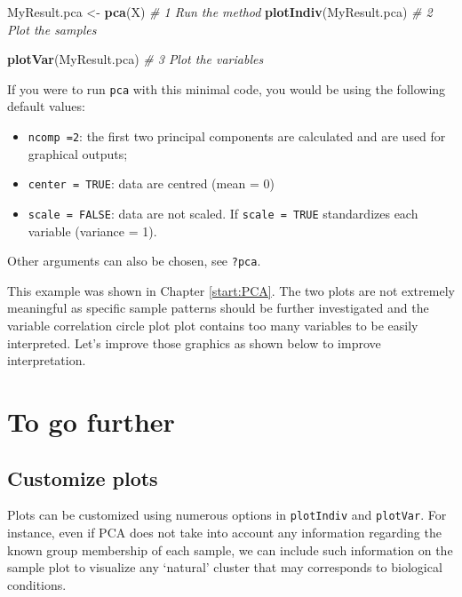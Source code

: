 \documentclass[]{book}
\newenvironment{Shaded}{\begin{snugshade}}{\end{snugshade}}
\newcommand{\KeywordTok}[1]{\textcolor[rgb]{0.13,0.29,0.53}{\textbf{#1}}}
\newcommand{\StringTok}[1]{\textcolor[rgb]{0.31,0.60,0.02}{#1}}
\newcommand{\CommentTok}[1]{\textcolor[rgb]{0.56,0.35,0.01}{\textit{#1}}}
\newcommand{\NormalTok}[1]{#1}
\providecommand{\tightlist}{%
  \setlength{\itemsep}{0pt}\setlength{\parskip}{0pt}}
\theoremstyle{definition}
\theoremstyle{definition}
\theoremstyle{definition}
\theoremstyle{remark}
\begin{document}
\begin{Shaded}
\begin{Highlighting}[]
\NormalTok{MyResult.pca <-}\StringTok{ }\KeywordTok{pca}\NormalTok{(X)     }\CommentTok{# 1 Run the method}
\KeywordTok{plotIndiv}\NormalTok{(MyResult.pca)    }\CommentTok{# 2 Plot the samples}
\end{Highlighting}
\end{Shaded}

\begin{Shaded}
\begin{Highlighting}[]
\KeywordTok{plotVar}\NormalTok{(MyResult.pca)      }\CommentTok{# 3 Plot the variables}
\end{Highlighting}
\end{Shaded}

If you were to run \texttt{pca} with this minimal code, you would be
using the following default values:

\begin{itemize}
\tightlist
\item
  \texttt{ncomp\ =2}: the first two principal components are calculated
  and are used for graphical outputs;
\item
  \texttt{center\ =\ TRUE}: data are centred (mean = 0)
\item
  \texttt{scale\ =\ FALSE}: data are not scaled. If
  \texttt{scale\ =\ TRUE} standardizes each variable (variance = 1).
\end{itemize}

Other arguments can also be chosen, see \texttt{?pca}.

This example was shown in Chapter \ref{start:PCA}. The two plots are not
extremely meaningful as specific sample patterns should be further
investigated and the variable correlation circle plot plot contains too
many variables to be easily interpreted. Let's improve those graphics as
shown below to improve interpretation.

\section{To go further}\label{to-go-further}

\subsection{Customize plots}\label{customize-plots}

Plots can be customized using numerous options in \texttt{plotIndiv} and
\texttt{plotVar}. For instance, even if PCA does not take into account
any information regarding the known group membership of each sample, we
can include such information on the sample plot to visualize any
`natural' cluster that may corresponds to biological conditions.
\end{document}
